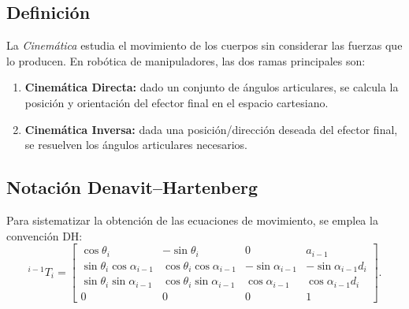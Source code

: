 \subsection*{Definición}
La \emph{Cinemática} estudia el movimiento de los cuerpos sin considerar las fuerzas que lo producen. En robótica de manipuladores, las dos ramas principales son:

\begin{enumerate}
	\item \textbf{Cinemática Directa:} dado un conjunto de ángulos articulares, se calcula la posición y orientación del efector final en el espacio cartesiano.
	\item \textbf{Cinemática Inversa:} dada una posición/dirección deseada del efector final, se resuelven los ángulos articulares necesarios.
\end{enumerate}

\subsection*{Notación Denavit–Hartenberg}
Para sistematizar la obtención de las ecuaciones de movimiento, se emplea la convención DH:
\[
{}^{i-1}T_i = 
\begin{bmatrix}
	\cos\theta_i & -\sin\theta_i & 0 & a_{i-1} \\
	\sin\theta_i\cos\alpha_{i-1} & \cos\theta_i\cos\alpha_{i-1} & -\sin\alpha_{i-1} & -\sin\alpha_{i-1}d_i \\
	\sin\theta_i\sin\alpha_{i-1} & \cos\theta_i\sin\alpha_{i-1} & \cos\alpha_{i-1} & \cos\alpha_{i-1}d_i \\
	0 & 0 & 0 & 1
\end{bmatrix}.
\]
